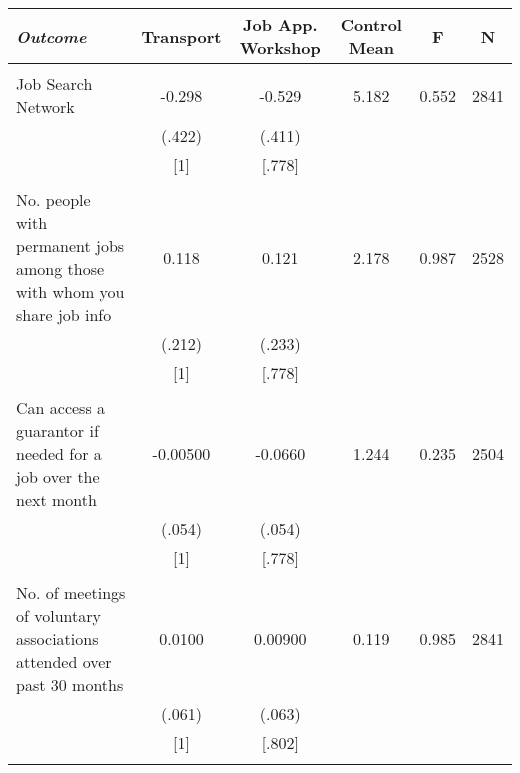 \begin{tabular}{lccccc} \hline
\multicolumn{1}{l}{\emph{Outcome}} & \multicolumn{1}{c}{Transport} &\multicolumn{1}{c}{Job App. Workshop} & \multicolumn{1}{c}{Control Mean} & \multicolumn{1}{c}{F} & \multicolumn{1}{c}{N} \\ \hline \\
Job Search Network & -0.298 & -0.529 & 5.182 & 0.552 & 2841 \\
& (.422) & (.411) &  &  &  \\
& [1] & [.778] &  &  &  \\
&  &  &  &  &  \\
No. people with permanent jobs among those with whom you share job info & 0.118 & 0.121 & 2.178 & 0.987 & 2528 \\
& (.212) & (.233) &  &  &  \\
& [1] & [.778] &  &  &  \\
&  &  &  &  &  \\
Can access a guarantor if needed for a job over the next month & -0.00500 & -0.0660 & 1.244 & 0.235 & 2504 \\
& (.054) & (.054) &  &  &  \\
& [1] & [.778] &  &  &  \\
&  &  &  &  &  \\
No. of meetings of voluntary associations attended over past 30 months & 0.0100 & 0.00900 & 0.119 & 0.985 & 2841 \\
& (.061) & (.063) &  &  &  \\
& [1] & [.802] &  &  &  \\
&  &  &  &  &  \\ \hline
\end{tabular}
